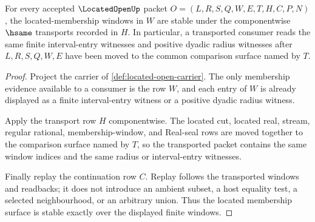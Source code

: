 \begin{theorem}
\label{thm:located-open-window-stability}
For every accepted $\LocatedOpenUp$ packet
$O=(L,R,S,Q,W,E,T,H,C,P,N)$, the located-membership windows in $W$ are stable
under the componentwise $\hsame$ transports recorded in $H$. In particular, a
transported consumer reads the same finite interval-entry witnesses and
positive dyadic radius witnesses after $L,R,S,Q,W,E$ have been moved to the
common comparison surface named by $T$.
\end{theorem}
\begin{proof}
Project the carrier of \autoref{def:located-open-carrier}. The only
membership evidence available to a consumer is the row $W$, and each entry of
$W$ is already displayed as a finite interval-entry witness or a positive
dyadic radius witness.

Apply the transport row $H$ componentwise. The located cut, located real,
stream, regular rational, membership-window, and Real-seal rows are moved
together to the comparison surface named by $T$, so the transported packet
contains the same window indices and the same radius or interval-entry
witnesses.

Finally replay the continuation row $C$. Replay follows the transported
windows and readbacks; it does not introduce an ambient subset, a host equality
test, a selected neighbourhood, or an arbitrary union. Thus the located
membership surface is stable exactly over the displayed finite windows.
\end{proof}

